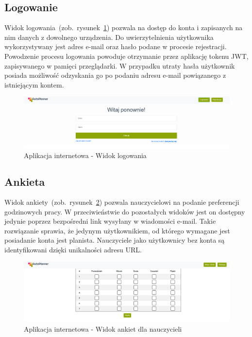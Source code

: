 \subsection{Logowanie}
Widok logowania~(zob.~rysunek~\ref{rys:login}) pozwala na dostęp do konta i zapisanych na nim danych z dowolnego urządzenia. Do uwierzytelnienia użytkownika wykorzystywany jest adres e-mail oraz hasło podane w procesie rejestracji. Powodzenie procesu logowania powoduje otrzymanie przez aplikację tokenu JWT, zapisywanego w pamięci przeglądarki. W przypadku utraty hasła użytkownik posiada możliwość odzyskania go po podaniu adresu e-mail powiązanego z istniejącym kontem.
\begin{figure}[!ht]
\centering\includegraphics[width=\textwidth]{figures/login}
\caption{Aplikacja internetowa - Widok logowania}\label{rys:login}
\end{figure}
\clearpage
\subsection{Ankieta}
Widok ankiety~(zob.~rysunek~\ref{rys:poll}) pozwala nauczycielowi na podanie preferencji godzinowych pracy. W przeciwieństwie do pozostałych widoków jest on dostępny jedynie poprzez bezpośredni link wysyłany w wiadomości e-mail. Takie rozwiązanie sprawia, że jedynym użytkownikiem, od którego wymagane jest posiadanie konta jest planista. Nauczyciele jako użytkownicy bez konta są identyfikowani dzięki unikalności adresu URL.
\begin{figure}[!ht]
\centering\includegraphics[width=\textwidth]{figures/poll}
\caption{Aplikacja internetowa - Widok ankiet dla nauczycieli}\label{rys:poll}
\end{figure}
